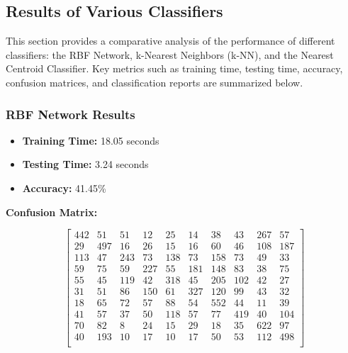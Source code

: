 \documentclass[lettersize,journal]{IEEEtran}
\begin{document}
\subsection{\textbf{Results of Various Classifiers}}

This section provides a comparative analysis of the performance of different classifiers: the RBF Network, k-Nearest Neighbors (k-NN), and the Nearest Centroid Classifier. Key metrics such as training time, testing time, accuracy, confusion matrices, and classification reports are summarized below.

\subsubsection{\textbf{RBF Network Results}}
\begin{itemize}
    \item \textbf{Training Time:} 18.05 seconds
    \item \textbf{Testing Time:} 3.24 seconds
    \item \textbf{Accuracy:} 41.45\%
\end{itemize}

\textbf{Confusion Matrix:}
\begin{scriptsize}
\[
\begin{bmatrix}
442 & 51 & 51 & 12 & 25 & 14 & 38 & 43 & 267 & 57 \\
29 & 497 & 16 & 26 & 15 & 16 & 60 & 46 & 108 & 187 \\
113 & 47 & 243 & 73 & 138 & 73 & 158 & 73 & 49 & 33 \\
59 & 75 & 59 & 227 & 55 & 181 & 148 & 83 & 38 & 75 \\
55 & 45 & 119 & 42 & 318 & 45 & 205 & 102 & 42 & 27 \\
31 & 51 & 86 & 150 & 61 & 327 & 120 & 99 & 43 & 32 \\
18 & 65 & 72 & 57 & 88 & 54 & 552 & 44 & 11 & 39 \\
41 & 57 & 37 & 50 & 118 & 57 & 77 & 419 & 40 & 104 \\
70 & 82 & 8 & 24 & 15 & 29 & 18 & 35 & 622 & 97 \\
40 & 193 & 10 & 17 & 10 & 17 & 50 & 53 & 112 & 498 \\
\end{bmatrix}
\]
\end{scriptsize}
\end{document}
